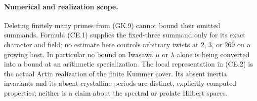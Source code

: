 \paragraph{Numerical and realization scope.}
Deleting finitely many primes from (GK.9) cannot bound
their omitted summands.  Formula (CE.1) supplies the
fixed-three summand only for its exact character and
field; no estimate here controls arbitrary twists at
$2$, $3$, or $269$ on a growing host.  In particular no
bound on Iwasawa $\mu$ or $\lambda$ alone is being
converted into a bound at an arithmetic specialization.
The local representation in (CE.2) is the actual Artin
realization of the finite Kummer cover.  Its absent
inertia invariants and its absent crystalline periods
are distinct, explicitly computed properties; neither
is a claim about the spectral or prolate Hilbert spaces.
